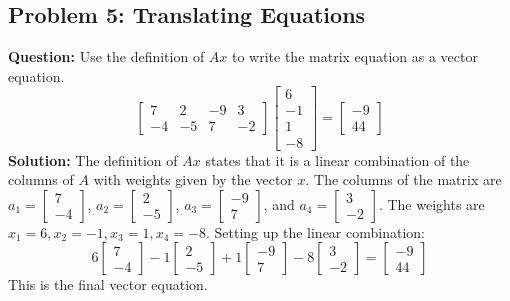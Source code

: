 \documentclass{article}
\begin{document}
\subsection{Problem 5: Translating Equations}
\textbf{Question:} Use the definition of $Ax$ to write the matrix equation as a vector equation.
\[ \begin{bmatrix} 7 & 2 & -9 & 3 \\ -4 & -5 & 7 & -2 \end{bmatrix} \begin{bmatrix} 6 \\ -1 \\ 1 \\ -8 \end{bmatrix} = \begin{bmatrix} -9 \\ 44 \end{bmatrix} \]
\textbf{Solution:}
The definition of $Ax$ states that it is a linear combination of the columns of $A$ with weights given by the vector $x$.
The columns of the matrix are $a_1 = \begin{bmatrix} 7 \\ -4 \end{bmatrix}$, $a_2 = \begin{bmatrix} 2 \\ -5 \end{bmatrix}$, $a_3 = \begin{bmatrix} -9 \\ 7 \end{bmatrix}$, and $a_4 = \begin{bmatrix} 3 \\ -2 \end{bmatrix}$.
The weights are $x_1 = 6, x_2 = -1, x_3 = 1, x_4 = -8$.
Setting up the linear combination:
\[ 6\begin{bmatrix} 7 \\ -4 \end{bmatrix} - 1\begin{bmatrix} 2 \\ -5 \end{bmatrix} + 1\begin{bmatrix} -9 \\ 7 \end{bmatrix} - 8\begin{bmatrix} 3 \\ -2 \end{bmatrix} = \begin{bmatrix} -9 \\ 44 \end{bmatrix} \]
This is the final vector equation.
\end{document}
